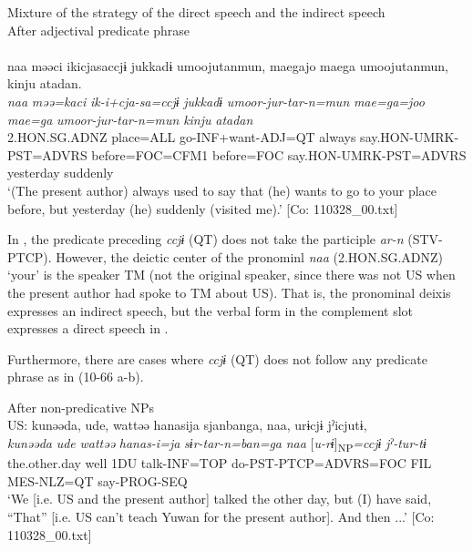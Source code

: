 \begin{xlist}
\ea\label{ex:10.65}   Mixture of the strategy of the direct speech and the indirect speech\\
  After adjectival predicate phrase\\\\
      \glll    naa  məəci  ikicjasaccjɨ  jukkadɨ  umoojutanmun,  {\textbar}mae{\textbar}gajo  {\textbar}mae{\textbar}ga  umoojutanmun,  kinju  atadan.\\                                                                                                                                                     
    \textit{naa}  \textit{məə=kaci}  \textit{ik-i+cja-sa=ccjɨ}  \textit{jukkadɨ}  \textit{umoor-jur-tar-n=mun}  \textit{mae=ga=joo}  \textit{mae=ga} \textit{umoor-jur-tar-n=mun}  \textit{kinju}  \textit{atadan}\\                                                                                                                                                     
    2.HON.SG.ADNZ  place=ALL  go-INF+want-ADJ=QT  always   say.HON-UMRK-PST=ADVRS  before=FOC=CFM1  before=FOC   say.HON-UMRK-PST=ADVRS  yesterday  suddenly\\
    \glt ‘(The present author) always used to say that (he) wants to go to your place before, but yesterday (he) suddenly (visited me).’ [Co: 110328\_00.txt]
\z

In , the predicate preceding \textit{ccjɨ} (QT) does not take the participle \textit{ar-n} (STV-PTCP). However, the deictic center of the pronominl \textit{naa} (2.HON.SG.ADNZ) ‘your’ is the speaker TM (not the original speaker, since there was not US when the present author had spoke to TM about US). That is, the pronominal deixis expresses an indirect speech, but the verbal form in the complement slot expresses a direct speech in .

  Furthermore, there are cases where \textit{ccjɨ} (QT) does not follow any predicate phrase as in (10-66 a-b).

\ea\label{ex:10.66}   After non-predicative NPs\\
  \ea  US: \glll kunəəda,  ude,  wattəə  hanasija  sjanbanga,   naa,  urɨcjɨ  jˀicjutɨ,\\
      \textit{kunəəda}  \textit{ude}  \textit{wattəə}  \textit{hanas-i=ja}  \textit{sɨr-tar-n=ban=ga}  \textit{naa}  [\textit{u-rɨ}]\textsubscript{NP}\textit{=ccjɨ}  \textit{jˀ{}-tur-tɨ}\\
      the.other.day  well  1DU  talk-INF=TOP  do-PST-PTCP=ADVRS=FOC  FIL  MES-NLZ=QT  say-PROG-SEQ\\
      \glt       ‘We [i.e. US and the present author] talked the other day, but (I) have said, “That” [i.e. US can’t teach Yuwan for the present author]. And then ...’ [Co: 110328\_00.txt]


\end{xlist}

